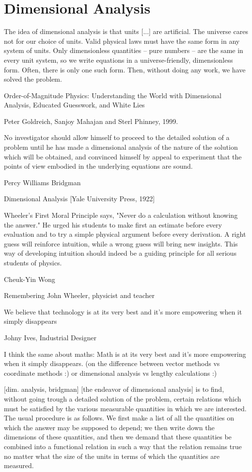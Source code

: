 \section{Dimensional Analysis}

\epigraph{The idea of dimensional analysis is that units [...] are artificial. The universe cares not for our choice of units. Valid physical laws must have the same form in any system of units. Only dimensionless quantities -- pure numbers -- are the same in every unit system, so we write equations in a universe-friendly, dimensionless form. Often, there is only one such form. Then, without doing any work, we have solved the problem.}
{Order-of-Magnitude Physics: Understanding the World with Dimensional Analysis, Educated Guesswork, and White Lies}
{Peter Goldreich, Sanjoy Mahajan and Sterl Phinney, 1999.}

\epigraph{No investigator should allow himself to proceed to the detailed solution of a problem until he has made a dimensional analysis of the nature of the solution which will be obtained, and convinced himself by appeal to experiment that the points of view embodied in the underlying equations are sound.}
{Percy Williams Bridgman}{Dimensional Analysis [Yale University Press, 1922]}

\epigraph{Wheeler's First Moral Principle says, "Never do a calculation without knowing the answer." He urged his students to make first an estimate before every evaluation and to try a simple physical argument before every derivation. A right guess will reinforce intuition, while a wrong guess will bring new insights. This way of developing intuition should indeed be a guiding principle for all serious students of physics.}{Cheuk-Yin Wong}{Remembering John Wheeler, physicist and teacher}

\epigraph{We believe that technology is at its very best and it's more empowering when it simply disappears}
{Johny Ives, Industrial Designer}{}

I think the same about maths: Math is at its very best and it's more empowering when it simply disappears. (on the difference between vector methods vs coordinate methods :) or dimensional analysis vs lengthy calculations :)

[dim. analysis, bridgman]
[the endeavor of dimensional analysis] is to find, without going trough a detailed solution of the problem, certain relations which must be satisfied by the various measurable quantities in which we are interested. The usual procedure is as follows. We first make a list of all the quantities on which the answer may be supposed to depend; we then write down the dimensions of these quantities, and then we demand that these quantities be combined into a functional relation in such a way that the relation remains true no matter what the size of the units in terms of which the quantities are measured.



